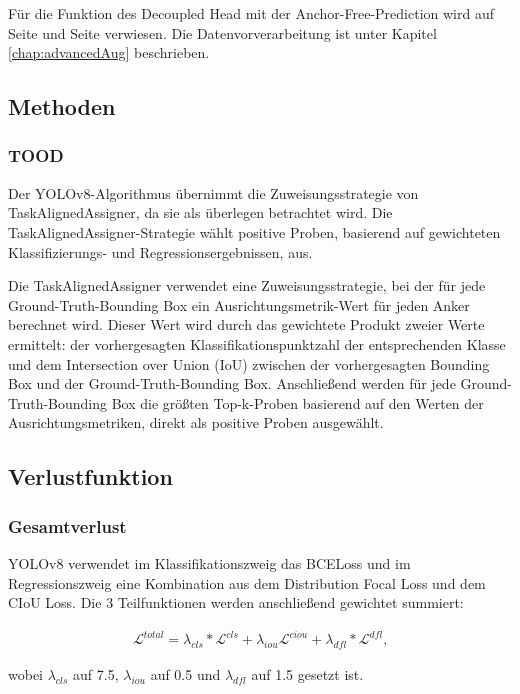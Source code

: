 Für die Funktion des Decoupled Head mit der Anchor-Free-Prediction wird auf Seite \pageref{chap:decoupledHead} und Seite \pageref{chap:anchorFree} verwiesen. Die Datenvorverarbeitung ist unter Kapitel \ref{chap:advancedAug} beschrieben. 

\subsection{Methoden}
\subsubsection{TOOD}
Der YOLOv8-Algorithmus übernimmt die Zuweisungsstrategie von TaskAlignedAssigner, da sie als überlegen betrachtet wird. Die TaskAlignedAssigner-Strategie wählt positive Proben, basierend auf gewichteten Klassifizierungs- und Regressionsergebnissen, aus. 

Die TaskAlignedAssigner verwendet eine Zuweisungsstrategie, bei der für jede Ground-Truth-Bounding Box ein Ausrichtungsmetrik-Wert für jeden Anker berechnet wird. Dieser Wert wird durch das gewichtete Produkt zweier Werte ermittelt: der vorhergesagten Klassifikationspunktzahl der entsprechenden Klasse und dem Intersection over Union (IoU) zwischen der vorhergesagten Bounding Box und der Ground-Truth-Bounding Box. Anschließend werden für jede Ground-Truth-Bounding Box die größten Top-k-Proben basierend auf den Werten der Ausrichtungsmetriken, direkt als positive Proben ausgewählt. \cite{yolov8ModelExplanation, yolov8LabelAssignment}

\subsection{Verlustfunktion}
\subsubsection{Gesamtverlust}
YOLOv8 verwendet im Klassifikationszweig das BCELoss und im Regressionszweig eine Kombination aus dem Distribution Focal Loss und dem CIoU Loss. Die 3 Teilfunktionen werden anschließend gewichtet summiert:

\begin{align}
	\mathcal{L}^{total}=\lambda_{cls}*\mathcal{L}^{cls}+\lambda_{iou}\mathcal{L}^{ciou}+	\lambda_{dfl}*\mathcal{L}^{dfl} \text{,}
\end{align}

wobei $\lambda_{cls}$ auf 7.5, $\lambda_{iou}$ auf 0.5 und $\lambda_{dfl}$ auf 1.5 gesetzt ist.


